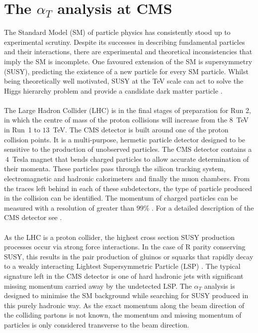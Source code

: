 
\section{The \boldmath $\alpha_T$ analysis at CMS}
\label{sec:Introduction}


The Standard Model (SM) of particle physics \cite{Salam1964,Glashow1961,Weinberg1967} has consistently stood up to experimental scrutiny. Despite its successes in describing fundamental particles and their interactions, there are experimental and theoretical inconsistencies that imply the SM is incomplete. One favoured extension of the SM is supersymmetry (SUSY), predicting the existence of a new particle for every SM particle. Whilst being theoretically well motivated, SUSY at the TeV scale can act to solve the Higgs hierarchy problem and provide a candidate dark matter particle \cite{SUSYprimerMartin:1997ns,susy1,susy2,susy3,susy4,susy5,susy6}.
\\\\
The Large Hadron Collider (LHC) \cite{LHCMachine} is in the final stages of preparation for Run 2, in which the centre of mass of the proton collisions will increase from the $8$~TeV in Run~1 to $13$~TeV. The CMS detector is built around one of the proton collision points. It is a multi-purpose, hermetic particle detector designed to be sensitive to the production of unobserved particles. The CMS detector contains a $~4$~Tesla magnet that bends charged particles to allow accurate determination of their momenta. These particles pass through the silicon tracking system, electromagnetic and hadronic calorimeters and finally the muon chambers. From the traces left behind in each of these subdetectors, the type of particle produced in the collision can be identified. The momentum of charged particles can be measured with a resolution of greater than $99\%$ \cite{ScienceArticle} \cite{CMSTechDesign1DetectorPerformance}. For a detailed description of the CMS detector see \cite{CMS_Overview_Chatrchyan:2008aa}.
\\\\
As the LHC is a proton collider, the highest cross section SUSY production processes occur via strong force interactions. In the case of R parity conserving SUSY, this results in the pair production of gluinos or squarks that rapidly decay to a weakly interacting Lightest Supersymmetric Particle (LSP) \cite{SUSYPhe_hadronic_states_Farrar:1978xj}. The typical signature left in the CMS detector is one of hard hadronic jets with significant missing momentum carried away by the undetected LSP. The $\alpha_T$ analysis is designed to minimise the SM background while searching for SUSY produced in this purely hadronic way. As the exact momentum along the beam direction of the colliding partons is not known, the momentum and missing momentum of particles is only considered transverse to the beam direction.


